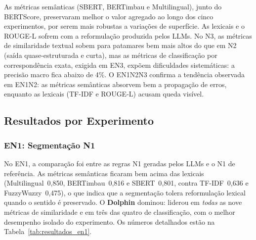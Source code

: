 \documentclass[a4paper,fleqn]{cas-sc}
\begin{document}
As métricas semânticas (SBERT, BERTimbau e Multilingual), junto do BERTScore, preservaram melhor o valor agregado ao longo dos cinco experimentos, por serem mais robustas a variações de superfície. As lexicais e o ROUGE-L sofrem com a reformulação produzida pelos LLMs. No N3, as métricas de similaridade textual sobem para patamares bem mais altos do que em N2 (saída quase-estruturada e curta), mas as métricas de classificação por correspondência exata, exigida em EN3, expõem dificuldades sistemáticas: a precisão macro fica abaixo de 4\%. O EN1N2N3 confirma a tendência observada em EN1N2: as métricas semânticas absorvem bem a propagação de erros, enquanto as lexicais (TF-IDF e ROUGE-L) acusam queda visível.

\subsection{Resultados por Experimento}

\subsubsection{EN1: Segmentação N1}

No EN1, a comparação foi entre as regras N1 geradas pelos LLMs e o N1 de referência. As métricas semânticas ficaram bem acima das lexicais (Multilingual~0{,}850, BERTimbau~0{,}816 e SBERT~0{,}801, contra TF-IDF~0{,}636 e FuzzyWuzzy~0{,}475), o que indica que a segmentação tolera reformulação lexical quando o sentido é preservado. O \textbf{Dolphin} dominou: liderou em \textit{todas} as nove métricas de similaridade e em três das quatro de classificação, com o melhor desempenho isolado do experimento. Os números detalhados estão na Tabela~\ref{tab:resultados_en1}.
\end{document}

